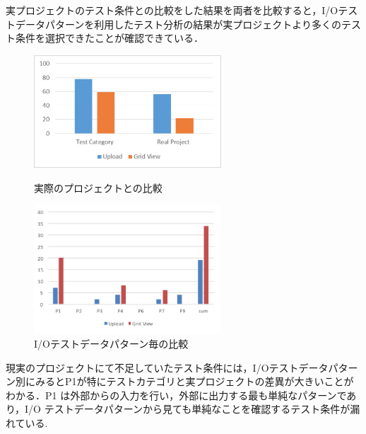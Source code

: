 \documentclass[10pt,a4j]{jarticle}
\begin{document}
実プロジェクトのテスト条件との比較をした結果を両者を比較すると，I/Oテストデータパターンを利用したテスト分析の結果が実プロジェクトより多くのテスト条件を選択できたことが確認できている．
\begin{figure}[htbp]
 \begin{minipage}{0.5\hsize}
  \begin{center}
   \includegraphics[width=70mm]{./image/D-4-Fig10.png}
  \end{center}
  \caption{実際のプロジェクトとの比較}
  \label{fig:D-4-Fig10}
 \end{minipage}
 \begin{minipage}{0.5\hsize}
  \begin{center}
   \includegraphics[width=70mm]{./image/D-4-Fig10b.png}
  \end{center}
  \caption{I/Oテストデータパターン毎の比較}
  \label{fig:D-4-Fig10b}
 \end{minipage}
\end{figure}


現実のプロジェクトにて不足していたテスト条件には，I/Oテストデータパターン別にみるとP1が特にテストカテゴリと実プロジェクトの差異が大きいことがわかる．P1 は外部からの入力を行い，外部に出力する最も単純なパターンであり，I/O テストデータパターンから見ても単純なことを確認するテスト条件が漏れている.
\end{document}
